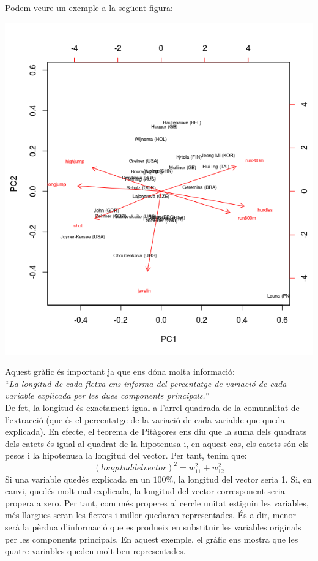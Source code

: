 \documentclass[english]{article}
\begin{document}
\noindent Podem veure un exemple a la següent figura:
\begin{center}
\includegraphics[scale=0.5]{biplot.png}
\end{center}
Aquest gràfic és important ja que ens dóna molta informació:
\\

``\textit{La longitud de cada fletxa ens informa del percentatge de variació de cada variable explicada per les dues components principals.}''
\\

De fet, la longitud és exactament igual a l'arrel quadrada de la comunalitat de l'extracció
(que és el percentatge de la variació de cada variable que queda explicada). En efecte, el
teorema de Pitàgores ens diu que la suma dels quadrats dels catets és igual al quadrat de
la hipotenusa i, en aquest cas, els catets són els pesos i la hipotenusa la longitud del
vector. Per tant, tenim que:
\begin{equation*}
(longitud del vector)^2 = w_{11}^2 + w_{12}^2
\end{equation*}
Si una variable quedés explicada en un $100\%$, la longitud del vector seria 1. Si, en canvi, quedés molt mal explicada, la longitud del vector corresponent seria propera a zero. Per tant, com més properes al cercle unitat estiguin les variables, més llargues seran les fletxes i millor quedaran representades. És a dir, menor serà la pèrdua d'informació que es produeix en substituir les variables originals per les components principals.
En aquest exemple, el gràfic ens mostra que les quatre variables queden molt ben
representades.
\\
\end{document}
